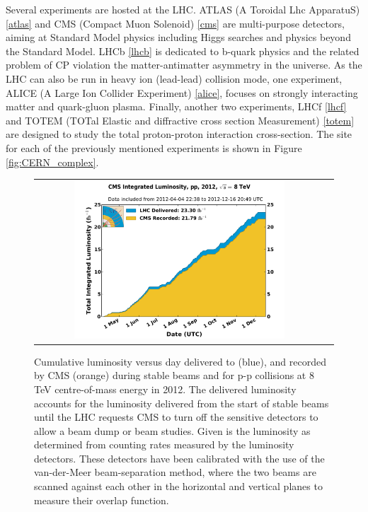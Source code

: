 Several experiments are hosted at the LHC. ATLAS (A Toroidal Lhc ApparatuS) \ref{atlas} and CMS (Compact Muon Solenoid) \ref{cms} are multi-purpose detectors, aiming at Standard Model physics including Higgs searches and physics beyond the Standard Model. LHCb \ref{lhcb} is dedicated to b-quark physics and the related problem of CP violation the matter-antimatter asymmetry in the universe. As the LHC can also be run in heavy ion (lead-lead) collision mode, one experiment, ALICE (A Large Ion Collider Experiment) \ref{alice}, focuses on strongly interacting matter and quark-gluon plasma. Finally, another two experiments, LHCf \ref{lhcf} and TOTEM (TOTal Elastic and diffractive cross section Measurement) \ref{totem} are designed to study the total proton-proton interaction cross-section. The site for each of the previously mentioned experiments is shown in Figure \ref{fig:CERN_complex}. 

\begin{figure}[tbh!]
	\centering
	\begin{tabular}{cc}
		\includegraphics[width=0.75\textwidth]{detector/pics/int_lumi_per_day_cumulative_pp_2012.pdf}
	\end{tabular}
	\caption{Cumulative luminosity versus day delivered to (blue), and recorded by CMS (orange) during stable beams and for p-p collisions at 8 TeV centre-of-mass energy in 2012. The delivered luminosity accounts for the luminosity delivered from the start of stable beams until the LHC requests CMS to turn off the sensitive detectors to allow a beam dump or beam studies. Given is the luminosity as determined from counting rates measured by the luminosity detectors. These detectors have been calibrated with the use of the van-der-Meer beam-separation method, where the two beams are scanned against each other in the horizontal and vertical planes to measure their overlap function.}
	\label{fig:lumi_2012}
\end{figure}

